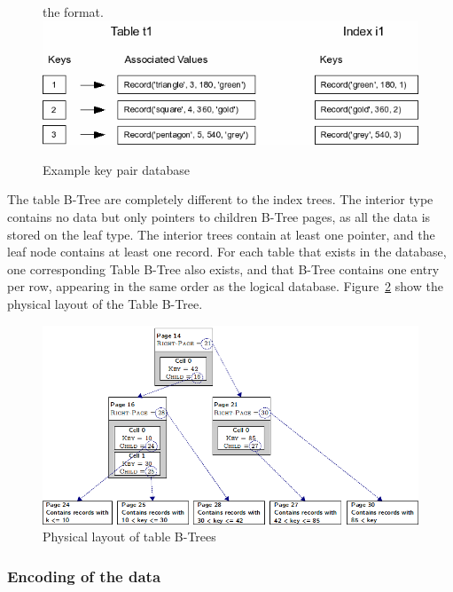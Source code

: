 \begin{figure}[H]the format.
	\centering
	\includegraphics[scale=0.5]{images/examplepop.png}
	\caption{Example key pair database \citep{sqliteray}}
	\label{fig:sqlite_key_pair}
\end{figure}

The table B-Tree are completely different to the index trees. The interior type contains no data but only pointers to children B-Tree pages, as all the data is stored on the leaf type. The interior trees contain at least one pointer, and the leaf node contains at least one record. For each table that exists in the database, one corresponding Table B-Tree also exists, and that B-Tree contains one entry per row, appearing in the same order as the logical database. Figure~\ref{fig:sqlite_table_btree} show the physical layout of the Table B-Tree. 

\begin{figure}[H]
	\centering
	\includegraphics[scale=0.5]{images/sqlite_table_btree.png}
	\caption{Physical layout of table B-Trees \citep{chibd}}
	\label{fig:sqlite_table_btree}
\end{figure}

\subsubsection{Encoding of the data}
\label{subsubsec:sqlite_data_encoding}

